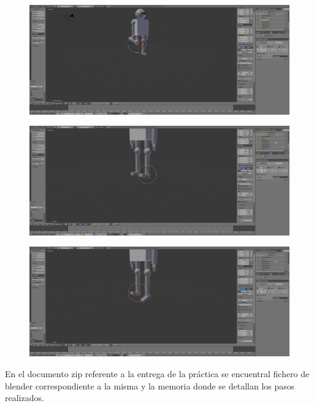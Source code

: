 \documentclass[10pt]{article}
\begin{document}
\begin{figure}[H]
	\begin{center}
	 		\includegraphics[width = 1.00\textwidth]{Imagenes/p2-img14.png}
	\end{center} 
\end{figure}

\begin{figure}[H]
	\begin{center}
	 		\includegraphics[width = 1.00\textwidth]{Imagenes/p2-img15.png}
	\end{center} 
\end{figure}

\begin{figure}[H]
	\begin{center}
	 		\includegraphics[width = 1.00\textwidth]{Imagenes/p2-img16.png}
	\end{center} 
\end{figure}
  

En el documento zip referente a la entrega de la práctica se encuentral fichero de blender correspondiente a la misma y la memoria donde se detallan los pasos realizados.
\end{document}
